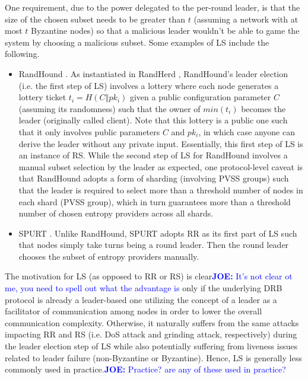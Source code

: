 \documentclass[letterpaper,twocolumn,10pt]{article}
\theoremstyle{definition}
\theoremstyle{remark}
\newcommand{\joenote}[1]{\textcolor{blue}{\textbf{JOE:} #1}}
\begin{document}
One requirement, due to the power delegated to the per-round leader, is that the size of the chosen subset needs to be greater than $t$ (assuming a network with at most $t$ Byzantine nodes) so that a malicious leader wouldn't be able to game the system by choosing a malicious subset. Some examples of LS include the following.
\begin{itemize}
\item RandHound \cite{syta2017scalable}. As instantiated in RandHerd \cite{syta2017scalable}, RandHound's leader election (i.e. the first step of LS) involves a lottery where each node generates a lottery ticket $t_i = H(C \mathbin\Vert pk_i)$ given a public configuration parameter $C$ (assuming its randomness) such that the owner of $min(t_i)$ becomes the leader (originally called client). Note that this lottery is a public one such that it only involves public parameters $C$ and $pk_i$, in which case anyone can derive the leader without any private input. Essentially, this first step of LS is an instance of RS. While the second step of LS for RandHound involves a manual subset selection by the leader as expected, one protocol-level caveat is that RandHound adopts a form of sharding (involving PVSS groups) such that the leader is required to select more than a threshold number of nodes in each shard (PVSS group), which in turn guarantees more than a threshold number of chosen entropy providers across all shards.
\item SPURT \cite{das2021spurt}. Unlike RandHound, SPURT adopts RR as its first part of LS such that nodes simply take turns being a round leader. Then the round leader chooses the subset of entropy providers manually.
\end{itemize}

The motivation for LS (as opposed to RR or RS) is clear\joenote{It's not clear ot me, you need to spell out what the advantage is} only if the underlying DRB protocol is already a leader-based one utilizing the concept of a leader as a facilitator of communication among nodes in order to lower the overall communication complexity. Otherwise, it naturally suffers from the same attacks impacting RR and RS (i.e. DoS attack and grinding attack, respectively) during the leader election step of LS while also potentially suffering from liveness issues related to leader failure (non-Byzantine or Byzantine). Hence, LS is generally less commonly used in practice.\joenote{Practice? are any of these used in practice?}
\end{document}
